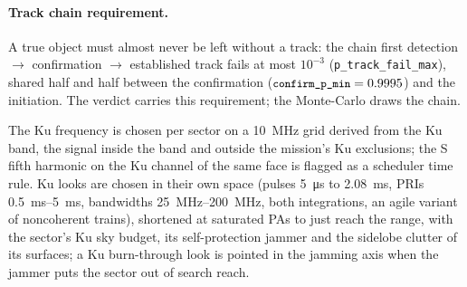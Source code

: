 \documentclass[11pt,a4paper]{article}
\newcommand{\code}[1]{\texttt{\small #1}}
\begin{document}
\paragraph{Track chain requirement.} A true object must almost never be left without a track: the chain first
detection $\to$ confirmation $\to$ established track fails at most $10^{-3}$ (\code{p\_track\_fail\_max}), shared
half and half between the confirmation ($\code{confirm\_p\_min} = 0.9995$) and the initiation. The verdict carries
this requirement; the Monte-Carlo draws the chain.

The Ku frequency is chosen per sector on a \SI{10}{MHz} grid derived from the Ku band, the signal inside the band and
outside the mission's Ku exclusions; the S fifth harmonic on the Ku channel of the same face is flagged as a scheduler
time rule. Ku looks are chosen in their own space (pulses \SI{5}{\micro s} to \SI{2.08}{ms}, PRIs \SIrange{0.5}{5}{ms},
bandwidths \SIrange{25}{200}{MHz}, both integrations, an agile variant of noncoherent trains), shortened at saturated
PAs to just reach the range, with the sector's Ku sky budget, its self-protection jammer and the sidelobe clutter of
its surfaces; a Ku burn-through look is pointed in the jamming axis when the jammer puts the sector out of search reach.
\end{document}
